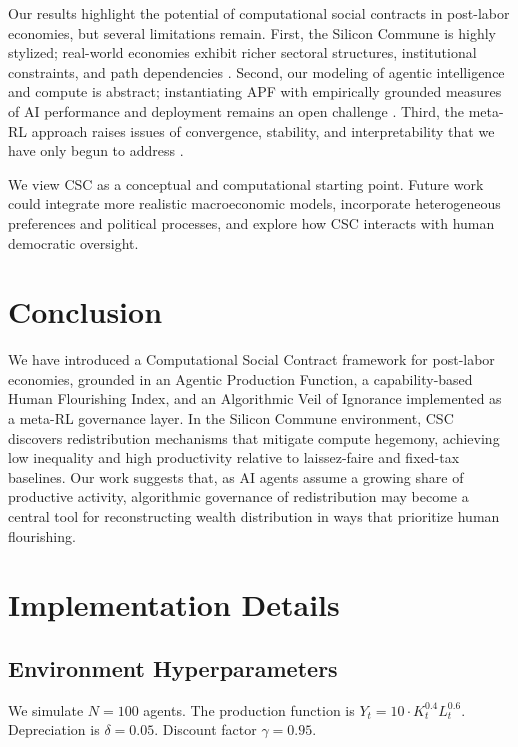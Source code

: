 \documentclass{article}
\begin{document}
Our results highlight the potential of computational social contracts in post-labor economies, but several limitations remain. First, the Silicon Commune is highly stylized; real-world economies exhibit richer sectoral structures, institutional constraints, and path dependencies \cite{schram2024laboratory,park2023generative}. Second, our modeling of agentic intelligence and compute is abstract; instantiating APF with empirically grounded measures of AI performance and deployment remains an open challenge \cite{brown2023language}. Third, the meta-RL approach raises issues of convergence, stability, and interpretability that we have only begun to address \cite{yang2026scalable,anthropic2023constitutional}.

We view CSC as a conceptual and computational starting point. Future work could integrate more realistic macroeconomic models, incorporate heterogeneous preferences and political processes, and explore how CSC interacts with human democratic oversight.

\section{Conclusion}
\label{sec:conclusion}

We have introduced a Computational Social Contract framework for post-labor economies, grounded in an Agentic Production Function, a capability-based Human Flourishing Index, and an Algorithmic Veil of Ignorance implemented as a meta-RL governance layer. In the Silicon Commune environment, CSC discovers redistribution mechanisms that mitigate compute hegemony, achieving low inequality and high productivity relative to laissez-faire and fixed-tax baselines. Our work suggests that, as AI agents assume a growing share of productive activity, algorithmic governance of redistribution may become a central tool for reconstructing wealth distribution in ways that prioritize human flourishing.

\nocite{*}



\appendix

\section{Implementation Details}

\subsection{Environment Hyperparameters}
We simulate $N=100$ agents. The production function is $Y_t = 10 \cdot K_t^{0.4} L_t^{0.6}$. Depreciation is $\delta=0.05$. Discount factor $\gamma=0.95$.
\end{document}

